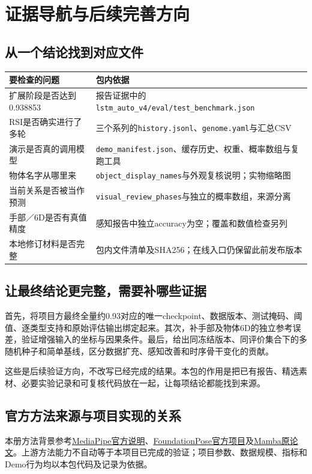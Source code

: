 \documentclass[11pt,a4paper,UTF8,fontset=fandol]{ctexart}
\newcommand{\code}[1]{{\small\nolinkurl{#1}}}
\begin{document}
\section{证据导航与后续完善方向}
\subsection{从一个结论找到对应文件}
\begin{tabularx}{\linewidth}{p{4cm}X}
\toprule 要检查的问题 & 包内依据\\\midrule
扩展阶段是否达到0.938853 & 报告证据中的\code{lstm_auto_v4/eval/test_benchmark.json}\\
RSI是否确实进行了多轮 & 三个系列的\code{history.jsonl}、\code{genome.yaml}与汇总CSV\\
演示是否真的调用模型 & \code{demo_manifest.json}、缓存历史、权重、概率数组与复跑工具\\
物体名字从哪里来 & \code{object_display_names}与外观复核说明；实物缩略图\\
当前关系是否被当作预测 & \code{visual_review_phases}与独立的概率数组，来源分离\\
手部／6D是否有真值精度 & 感知报告中独立accuracy为空；覆盖和数值检查另列\\
本地修订材料是否完整 & 包内文件清单及SHA256；在线入口仍保留此前发布版本\\\bottomrule
\end{tabularx}

\subsection{让最终结论更完整，需要补哪些证据}
首先，将项目方最终全量约0.93对应的唯一checkpoint、数据版本、测试掩码、阈值、逐类型支持和原始评估输出绑定起来。其次，补手部及物体6D的独立参考误差，验证增强输入的坐标与因果条件。最后，给出同冻结版本、同评价集合下的多随机种子和简单基线，区分数据扩充、感知改善和时序骨干变化的贡献。

这些是后续验证方向，不改写已经完成的结果。本包的作用是把已有报告、精选素材、必要实验记录和可复核代码放在一起，让每项结论都能找到来源。

\subsection{官方方法来源与项目实现的关系}
本册方法背景参考\href{https://developers.google.com/edge/mediapipe/solutions/vision/hand_landmarker}{MediaPipe官方说明}、\href{https://nvlabs.github.io/FoundationPose/}{FoundationPose官方项目}及\href{https://arxiv.org/abs/2312.00752}{Mamba原论文}。上游方法能力不自动等于本项目已完成的验证；项目参数、数据规模、指标和Demo行为均以本包代码及记录为依据。
\end{document}
